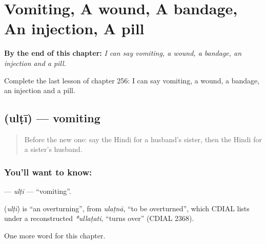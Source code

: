 
\chapter{Vomiting, A wound, A bandage, An injection, A pill}
\label{ch:hi-vomiting-a-wound-a-bandage-an-injection-a-pill}

\begin{chapteropening}
\textbf{By the end of this chapter:} \emph{I can say vomiting, a wound, a bandage, an injection and a pill.}

Complete the last lesson of chapter 256: I can say vomiting, a wound, a bandage, an injection and a pill.
\end{chapteropening}

\section[\texorpdfstring{\hi{उल्टी} (ulṭī)}{उल्टी (ulṭī)}]{ (ulṭī) — vomiting}

\label{lesson:HI-C256-ulti}



\begin{quote}
Before the new one: say the Hindi for a husband's sister, then the Hindi for a sister's husband.
\end{quote}

\subsection*{You'll want to know: }
\textbf{} — \emph{ulṭī} — \textquotedblleft{}vomiting\textquotedblright{}.

\begin{cousinweb}
\textbf{} (\emph{ulṭī}) is \textquotedblleft{}an overturning\textquotedblright{}, from \emph{ulaṭnā}, \textquotedblleft{}to be overturned\textquotedblright{}, which CDIAL lists under a reconstructed \emph{*ullaṭati}, \textquotedblleft{}turns over\textquotedblright{} (CDIAL 2368).
\end{cousinweb}

\begin{grammarlens}[title={What you've built}]
One more word for this chapter.
\end{grammarlens}

